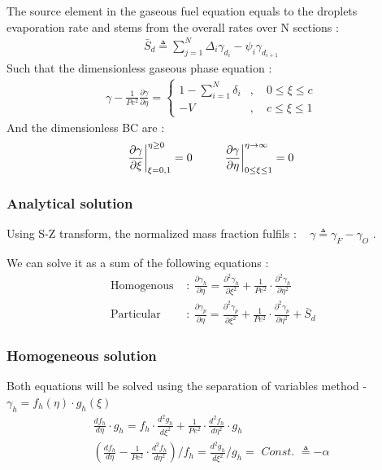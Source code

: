 \documentclass[12pt]{article}
\newcommand\tab[1][1cm]{\hspace*{#1}}
\numberwithin{equation}{section}
\begin{document}
\begin{flushleft}
\newpage 
The source element in the gaseous fuel equation equals to the droplets evaporation rate and stems from the overall rates over $\mathrm{N}$ sections :
\begin{align} 
\bar{S}_{d} \triangleq \sum_{j=1}^{N} \Delta_{i} \gamma_{d_{i}}-\psi_{i} \gamma_{d_{i+1}}
\end{align} 
Such that the dimensionless gaseous phase equation :
\begin{align} 
\gamma-\frac{1}{P e^{2}} \frac{\partial \gamma}{\partial \eta}= 
\begin{cases}
1-\sum_{i=1}^{N} \delta_{i} & , \quad 0 \leq \xi \leq c \\
-V & , \quad c \leq \xi \leq 1
\end{cases} \label{3_gas_phase}
\end{align} 
And the dimensionless BC are :
\begin{align} 
\frac{\partial \gamma}{\partial \xi} \bigg|_{\xi=0,1}^{\eta \geq 0}= 0 \tab \frac{\partial \gamma}{\partial \eta} \bigg|_{0 \leq \xi \leq 1}^{\eta \rightarrow \infty}=0
\end{align} 

\subsubsection{Analytical solution}
Using S-Z transform, the normalized mass fraction fulfils $: \quad \gamma \triangleq \gamma_{F}-\gamma_{O}$ .

We can solve it as a sum of the following equations :
\begin{align} 
\text { Homogenous } &: \ \frac{\partial \gamma_{h}}{\partial \eta}=\frac{\partial^{2} \gamma_{h}}{\partial \xi^{2}}+\frac{1}{P e^{2}} \cdot \frac{\partial^{2} \gamma_{h}}{\partial \eta^{2}} \\
\text { Particular } &: \ \frac{\partial \gamma_{p}}{\partial \eta}=\frac{\partial^{2} \gamma_{p}}{\partial \xi^{2}}+\frac{1}{P e^{2}} \cdot \frac{\partial^{2} \gamma_{p}}{\partial \eta^{2}}+\bar{S}_{d}
\end{align} 

\subsubsection*{Homogeneous solution}
Both equations will be solved using the separation of variables method - $\gamma_{h}=f_{h}(\eta) \cdot g_{h}(\xi)$
\begin{align} 
\frac{d f_{h}}{d \eta} \cdot g_{h}=f_{h} \cdot \frac{d^{2} g_{h}}{d \xi^{2}}+\frac{1}{P e^{2}} \cdot \frac{d^{2} f_{h}}{d \eta^{2}} \cdot g_{h} \\
\left(\frac{d f_{h}}{d \eta}-\frac{1}{P e^{2}} \cdot \frac{d^{2} f_{h}}{d \eta^{2}}\right) / f_{h}=\frac{d^{2} g_{h}}{d \xi^{2}} / g_{h}=\textit{ Const. } \triangleq-\alpha
\end{align} 


\end{flushleft}
\end{document}
